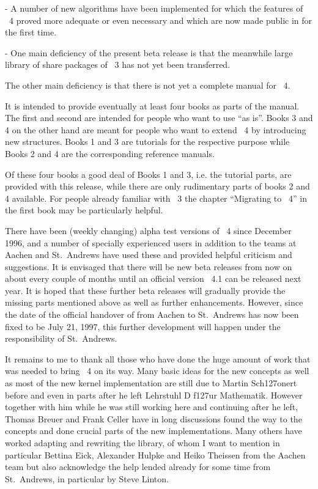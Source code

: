   \item{-}
    A number    of new algorithms  have  been  implemented for  which the
    features of {\GAP}~4 proved more adequate or even necessary and which
    are now made public in {\GAP} for the first time.

  \item{-}
    One main deficiency of the present beta release is that the meanwhile
    large   library of share  packages  of   {\GAP}~3  has not  yet  been
    transferred.
\endlist

The other main deficiency is that there is not yet  a complete manual for
{\GAP}~4.

It is intended to provide eventually at least four  books as parts of the
manual. The  first and second  are intended for  people  who want  to use
{\GAP} ``as is''.  Books 3 and 4  on the other hand  are meant for people
who want to extend {\GAP}~4 by introducing new structures.  Books 1 and 3
are  tutorials for the respective   purpose while Books  2 and  4 are the
corresponding reference manuals.

Of these four books a  good deal  of Books 1   and 3, i.e.  the  tutorial
parts, are provided with  this release, while  there are only rudimentary
parts  of books  2  and 4  available.   For people  already familiar with
{\GAP}~3 the chapter ``Migrating  to {\GAP}~4'' in the  first book may be
particularly helpful.

There have been (weekly  changing) alpha test versions  of {\GAP}~4 since
December  1996, and a number   of specially experienced  {\GAP} users  in
addition to  the {\GAP} teams at Aachen  and St.~Andrews  have used these
and   provided helpful criticism and  suggestions.   It is envisaged that
there will be new beta releases from now on about  every couple of months
until an  official version  {\GAP}~4.1 can be released  next year.  It is
hoped that these further beta releases will gradually provide the missing
parts mentioned above as well as further enhancements. However, since the
date of the official  handover of {\GAP} from  Aachen to  St.~Andrews has
now been fixed to be July 21, 1997, this  further development will happen
under the responsibility of St.~Andrews.

It remains to me to thank all those who have done the huge amount of work
that was needed to  bring {\GAP}~4 on its way.   Many basic ideas for the
new concepts as well as  most of the  new kernel implementation are still
due to Martin  Sch\accent127onert before and  even in parts after he left
Lehrstuhl D  f\accent127ur Mathematik.
However together with him while he was still working here and continuing
after he left,
Thomas Breuer and Frank Celler have in long discussions found the way
to the concepts and done crucial parts of the new implementations.
Many others have worked adapting and rewriting the library,
of whom I want to mention in particular Bettina Eick, Alexander Hulpke
and Heiko Theissen from the Aachen team
but also acknowledge the help lended already for some time from
St.~Andrews, in particular by Steve Linton.

